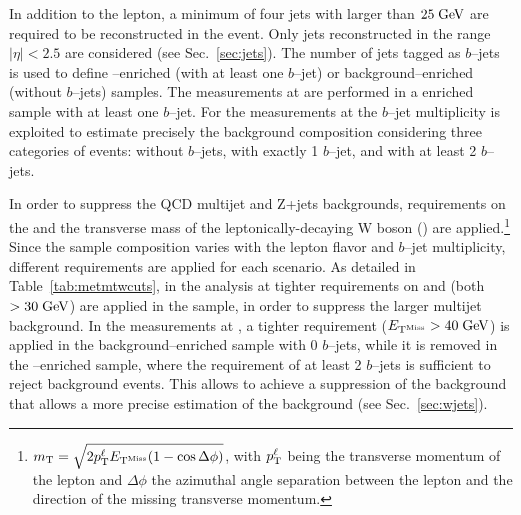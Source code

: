 In addition to the lepton, a minimum of four jets with \pt{} larger
than $25 \; \mathrm{GeV}$ are required to be reconstructed in the event. Only
jets reconstructed in the range $|\eta|<2.5$ are
considered (see Sec.~\ref{sec:jets}). The number of jets tagged as
$b$--jets is used to define \ttbar{}--enriched (with at least one $b$--jet) or
background--enriched (without $b$--jets) samples. The measurements at
\seventev{} are performed in a \ttbar{} enriched sample with at least
one $b$--jet. For the measurements at \eighttev{} the \mbox{$b$--jet}
multiplicity is exploited to estimate precisely the background
composition considering three categories of events: without $b$--jets,
with exactly 1 $b$--jet, and with at least 2 $b$--jets. 

In order to suppress the QCD multijet and Z+jets backgrounds,
requirements on the \met{} and the transverse mass of the
leptonically-decaying W boson (\mtw{}) are applied.\footnote{$m_{\mathrm{T}} = \sqrt{2
    p^\ell_{\rm T} \mbox{\ensuremath{E_{\mathrm{T}^{\mathrm{Miss}}}}} (1-\cos\Delta\phi)}$, with $p^\ell_{\rm T}$
  being the transverse momentum of the lepton and
  $\Delta\phi$ the azimuthal angle separation between the lepton and
  the direction of the missing transverse momentum.} Since the sample
composition varies with the lepton flavor and $b$--jet multiplicity,
different requirements are applied for each scenario. As detailed in
Table~\ref{tab:metmtwcuts}, in the analysis at \seventev{} tighter
requirements on \met{} and \mtw{} (both $>30 \; \mathrm{GeV}$) are applied in the
\ejets{} sample, in order to suppress the larger multijet background. 
In the measurements at \eighttev{}, a tighter requirement
($\mbox{\ensuremath{E_{\mathrm{T}^{\mathrm{Miss}}}}}{}>40\; \mathrm{GeV}{}$) is applied in the background--enriched sample with
0 $b$--jets, while it is removed in the \ttbar{}--enriched sample,
where the requirement of at least 2 $b$--jets is sufficient to reject
background events. This allows to achieve a suppression of the
\zjets{} background that allows a more precise estimation of the
\wjets{} background (see Sec.~\ref{sec:wjets}). 

